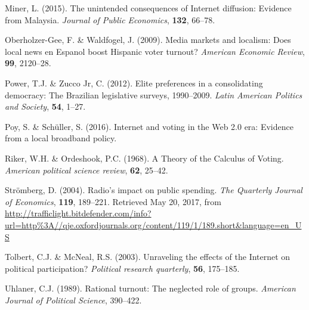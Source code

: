 \documentclass[
  12pt,
]{article}
\begin{document}
\leavevmode\hypertarget{ref-miner_unintended_2015}{}%
Miner, L. (2015). The unintended consequences of Internet diffusion:
Evidence from Malaysia. \emph{Journal of Public Economics},
\textbf{132}, 66--78.

\leavevmode\hypertarget{ref-oberholzer-gee_media_2009}{}%
Oberholzer-Gee, F. \& Waldfogel, J. (2009). Media markets and localism:
Does local news en Espanol boost Hispanic voter turnout? \emph{American
Economic Review}, \textbf{99}, 2120--28.

\leavevmode\hypertarget{ref-power_elite_2012}{}%
Power, T.J. \& Zucco Jr, C. (2012). Elite preferences in a consolidating
democracy: The Brazilian legislative surveys, 1990--2009. \emph{Latin
American Politics and Society}, \textbf{54}, 1--27.

\leavevmode\hypertarget{ref-poy_internet_2016}{}%
Poy, S. \& Schüller, S. (2016). Internet and voting in the Web 2.0 era:
Evidence from a local broadband policy.

\leavevmode\hypertarget{ref-riker_theory_1968}{}%
Riker, W.H. \& Ordeshook, P.C. (1968). A Theory of the Calculus of
Voting. \emph{American political science review}, \textbf{62}, 25--42.

\leavevmode\hypertarget{ref-stromberg_radios_2004}{}%
Strömberg, D. (2004). Radio's impact on public spending. \emph{The
Quarterly Journal of Economics}, \textbf{119}, 189--221. Retrieved May
20, 2017, from
\url{http://trafficlight.bitdefender.com/info?url=http\%3A//qje.oxfordjournals.org/content/119/1/189.short\&language=en_US}

\leavevmode\hypertarget{ref-tolbert_unraveling_2003}{}%
Tolbert, C.J. \& McNeal, R.S. (2003). Unraveling the effects of the
Internet on political participation? \emph{Political research
quarterly}, \textbf{56}, 175--185.

\leavevmode\hypertarget{ref-uhlaner_rational_1989}{}%
Uhlaner, C.J. (1989). Rational turnout: The neglected role of groups.
\emph{American Journal of Political Science}, 390--422.
\end{document}
